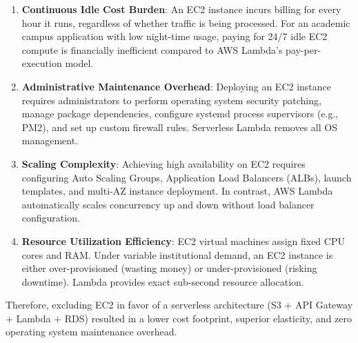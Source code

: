 \begin{enumerate}
    \item \textbf{Continuous Idle Cost Burden}: An EC2 instance incurs billing for every hour it runs, regardless of whether traffic is being processed. For an academic campus application with low night-time usage, paying for 24/7 idle EC2 compute is financially inefficient compared to AWS Lambda's pay-per-execution model.
    \item \textbf{Administrative Maintenance Overhead}: Deploying an EC2 instance requires administrators to perform operating system security patching, manage package dependencies, configure systemd process supervisors (e.g., PM2), and set up custom firewall rules. Serverless Lambda removes all OS management.
    \item \textbf{Scaling Complexity}: Achieving high availability on EC2 requires configuring Auto Scaling Groups, Application Load Balancers (ALBs), launch templates, and multi-AZ instance deployment. In contrast, AWS Lambda automatically scales concurrency up and down without load balancer configuration.
    \item \textbf{Resource Utilization Efficiency}: EC2 virtual machines assign fixed CPU cores and RAM. Under variable institutional demand, an EC2 instance is either over-provisioned (wasting money) or under-provisioned (risking downtime). Lambda provides exact sub-second resource allocation.
\end{enumerate}

Therefore, excluding EC2 in favor of a serverless architecture (S3 + API Gateway + Lambda + RDS) resulted in a lower cost footprint, superior elasticity, and zero operating system maintenance overhead.
